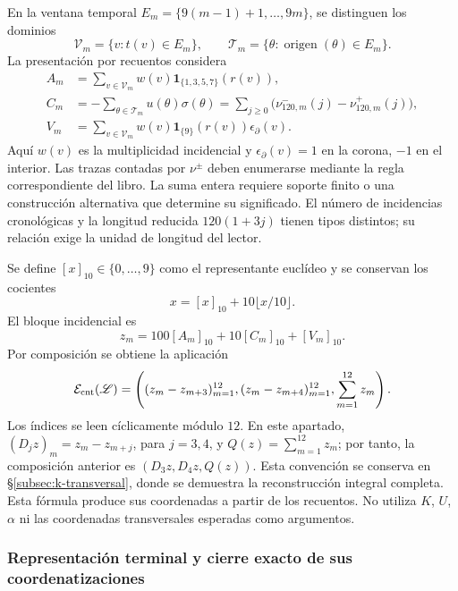 En la ventana temporal
\(E_m=\{9(m-1)+1,\ldots,9m\}\), se distinguen los dominios
\[
 \mathscr V_m=\{v:t(v)\in E_m\},\qquad
 \mathscr T_m=\{\theta:\operatorname{origen}(\theta)\in E_m\}.
\]
La presentación por recuentos considera
\begin{align}
 A_m&=\sum_{v\in\mathscr V_m}w(v)
             \mathbf1_{\{1,3,5,7\}}(r(v)),\\
 C_m&=-\sum_{\theta\in\mathscr T_m}u(\theta)\sigma(\theta)
      =\sum_{j\geq0}\bigl(\nu^-_{120,m}(j)-\nu^+_{120,m}(j)\bigr),\\
 V_m&=\sum_{v\in\mathscr V_m}w(v)
              \mathbf1_{\{9\}}(r(v))\epsilon_\partial(v).
\end{align}
Aquí \(w(v)\) es la multiplicidad incidencial y
\(\epsilon_\partial(v)=1\) en la corona, \(-1\) en el interior.
Las trazas contadas por \(\nu^\pm\) deben enumerarse mediante la regla
correspondiente del libro. La suma entera requiere soporte finito o una
construcción alternativa que determine su significado. El número de
incidencias cronológicas y la longitud reducida \(120(1+3j)\) tienen
tipos distintos; su relación exige la unidad de longitud del lector.

Se define \([x]_{10}\in\{0,\ldots,9\}\) como el representante
euclídeo y se conservan los cocientes
\[
 x=[x]_{10}+10\lfloor x/10\rfloor.
\]
El bloque incidencial es
\begin{equation}
 z_m=100[A_m]_{10}+10[C_m]_{10}+[V_m]_{10}.
 \label{eq:registro-bloque-incidencial}
\end{equation}
Por composición se obtiene la aplicación
\begin{equation}
 \mathcal E_{\rm cnt}(\mathscr L)=
 \left((z_m-z_{m+3})_{m=1}^{12},
       (z_m-z_{m+4})_{m=1}^{12},\sum_{m=1}^{12}z_m\right).
\label{eq:registro-composicion-incidencial}
\end{equation}
Los índices se leen cíclicamente módulo \(12\). En este apartado,
\((D_jz)_m=z_m-z_{m+j}\), para \(j=3,4\), y
\(Q(z)=\sum_{m=1}^{12}z_m\); por tanto, la composición anterior es
\((D_3z,D_4z,Q(z))\). Esta convención se conserva en
\S\ref{subsec:k-transversal}, donde se demuestra la reconstrucción
integral completa.
Esta fórmula produce sus coordenadas a partir de los recuentos. No utiliza
\(K\), \(U\), \(\alpha\) ni las coordenadas transversales esperadas
como argumentos.

\subsubsection{Representación terminal y cierre exacto de sus coordenatizaciones}

